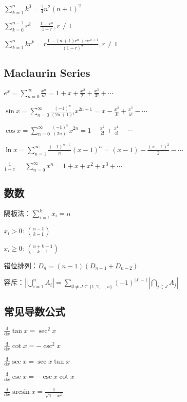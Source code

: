 \documentclass[9pt,landscape]{article}
\begin{document}
\begin{multicols}{3}
$\sum_{k=1}^{n}k^3=\frac{1}{4}n^2(n+1)^2$

$\sum_{k=0}^{n-1}r^k=\frac{1-r^n}{1-r}, r\neq 1$

$\sum_{k=1}^{n}kr^k=r\frac{1-(n+1)r^n+nr^{n+1}}{(1-r)^2}, r\neq 1$

\subsection{Maclaurin Series}

$e^x = \sum_{n=0}^{\infty} \frac{x^n}{n!} = 1 + x + \frac{x^2}{2!} + \frac{x^3}{3!} + \cdots$

$\sin x = \sum_{n=0}^{\infty} \frac{(-1)^n}{(2n+1)!}x^{2n+1} = x - \frac{x^3}{3!} + \frac{x^5}{5!} - \cdots$

$\cos x = \sum_{n=0}^{\infty} \frac{(-1)^n}{(2n)!}x^{2n} = 1 - \frac{x^2}{2!} + \frac{x^4}{4!} - \cdots$

$\ln x = \sum_{n=1}^{\infty} \frac{(-1)^{n-1}}{n}(x-1)^n = (x-1) - \frac{(x-1)^2}{2} - \cdots$

$\frac{1}{1-x} = \sum_{n=0}^{\infty} x^n = 1 + x + x^2 + x^3 + \cdots$

\subsection{数数}

隔板法：$\sum_{i=1}^{k} x_i=n$

$x_i>0$: $\binom{n-1}{k-1}$

$x_i\ge 0$: $\binom{n+k-1}{k-1}$

错位排列：$D_n=(n-1)\left(D_{n-1}+D_{n-2}\right)$

容斥：$ \left|\bigcup _{i=1}^{n}A_{i}\right|=\sum _{\emptyset \neq J\subseteq \{1,2,\ldots ,n\}}(-1)^{|J|-1}\left|\bigcap _{j\in J}A_{j}\right| $

\subsection{常见导数公式}

$\frac{\mathrm{d}}{\mathrm{d}x}\tan x=\sec ^{2}x$

$\frac{\mathrm{d}}{\mathrm{d}x}\cot x=-\csc ^{2}x$

$\frac{\mathrm{d}}{\mathrm{d}x}\sec x=\sec x\tan x$

$\frac{\mathrm{d}}{\mathrm{d}x}\csc x=-\csc x\cot x$

$\frac{\mathrm{d}}{\mathrm{d}x}\arcsin x={\frac {1}{\sqrt {1-x^{2}}}}$


\end{multicols}
\end{document}
